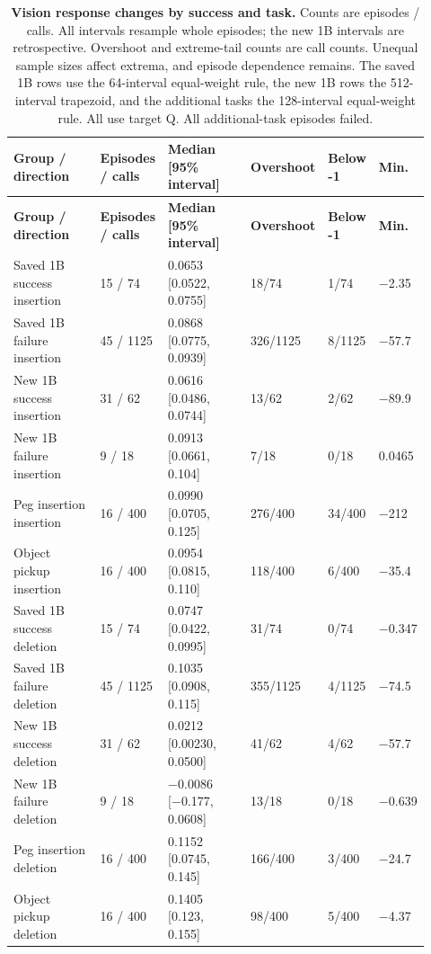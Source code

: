 \setlength{\tabcolsep}{2pt}
\begin{longtable}{p{0.250\linewidth} p{0.120\linewidth} p{0.240\linewidth} p{0.110\linewidth} p{0.110\linewidth} p{0.090\linewidth}}
\caption{\textbf{Vision response changes by success and task.} Counts are episodes / calls. All intervals resample whole episodes; the new 1B intervals are retrospective. Overshoot and extreme-tail counts are call counts. Unequal sample sizes affect extrema, and episode dependence remains. The saved 1B rows use the 64-interval equal-weight rule, the new 1B rows the 512-interval trapezoid, and the additional tasks the 128-interval equal-weight rule. All use target Q. All additional-task episodes failed.}\label{tab:r1-success-summary}\\
\toprule
\textbf{Group / direction} & \textbf{Episodes / calls} & \textbf{Median [95\% interval]} & \textbf{Overshoot} & \textbf{Below -1} & \textbf{Min.} \\
\midrule\endfirsthead
\toprule
\textbf{Group / direction} & \textbf{Episodes / calls} & \textbf{Median [95\% interval]} & \textbf{Overshoot} & \textbf{Below -1} & \textbf{Min.} \\
\midrule\endhead
\bottomrule\endfoot
Saved 1B success insertion & 15 / 74 & 0.0653 [0.0522, 0.0755] & 18/74 & 1/74 & −2.35 \\
Saved 1B failure insertion & 45 / 1125 & 0.0868 [0.0775, 0.0939] & 326/1125 & 8/1125 & −57.7 \\
New 1B success insertion & 31 / 62 & 0.0616 [0.0486, 0.0744] & 13/62 & 2/62 & −89.9 \\
New 1B failure insertion & 9 / 18 & 0.0913 [0.0661, 0.104] & 7/18 & 0/18 & 0.0465 \\
Peg insertion insertion & 16 / 400 & 0.0990 [0.0705, 0.125] & 276/400 & 34/400 & −212 \\
Object pickup insertion & 16 / 400 & 0.0954 [0.0815, 0.110] & 118/400 & 6/400 & −35.4 \\
Saved 1B success deletion & 15 / 74 & 0.0747 [0.0422, 0.0995] & 31/74 & 0/74 & −0.347 \\
Saved 1B failure deletion & 45 / 1125 & 0.1035 [0.0908, 0.115] & 355/1125 & 4/1125 & −74.5 \\
New 1B success deletion & 31 / 62 & 0.0212 [0.00230, 0.0500] & 41/62 & 4/62 & −57.7 \\
New 1B failure deletion & 9 / 18 & −0.0086 [−0.177, 0.0608] & 13/18 & 0/18 & −0.639 \\
Peg insertion deletion & 16 / 400 & 0.1152 [0.0745, 0.145] & 166/400 & 3/400 & −24.7 \\
Object pickup deletion & 16 / 400 & 0.1405 [0.123, 0.155] & 98/400 & 5/400 & −4.37 \\
\end{longtable}

